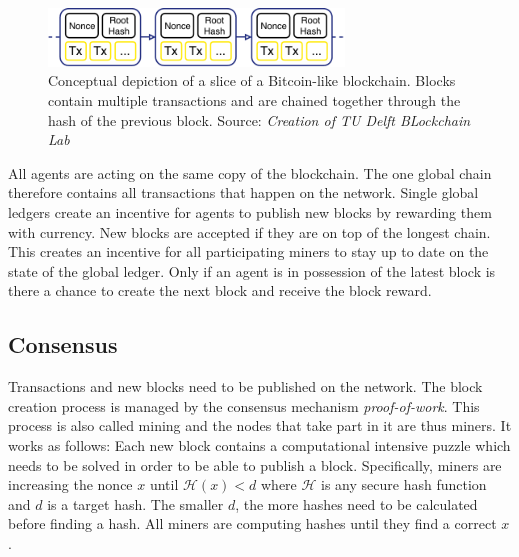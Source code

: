 \begin{figure}
    \centering
    \includegraphics[width=0.7\textwidth]{images/blockchain.pdf}
    \caption{Conceptual depiction of a slice of a Bitcoin-like blockchain. Blocks contain multiple transactions and are chained together through the hash of the previous block. Source: \textit{Creation of TU Delft BLockchain Lab}}
    \label{fig:basic_blockchain}
\end{figure}

All agents are acting on the same copy of the blockchain. The one global chain therefore contains 
all transactions that happen on the network. Single global ledgers create an incentive for agents to publish new blocks by rewarding 
them with currency. New blocks are accepted if they are on top of the longest chain. This creates 
an incentive for all participating miners to stay up to date on the state of the global ledger. Only
if an agent is in possession of the latest block is there a chance to create the next block and
receive the block reward. 



\subsection{Consensus}
Transactions and new blocks need to be published  on the network. The block creation process
is managed by the consensus mechanism \textit{proof-of-work}. This process is also called mining and the nodes
that take part in it are thus miners. It works as follows: Each new block contains a computational 
intensive puzzle which needs to be solved in order to be able to publish a block. Specifically, 
miners are increasing the nonce $x$ until $\mathcal{H}(x) < d$ where $\mathcal{H}$ is any secure hash
function and $d$ is a target hash. The smaller $d$, the more hashes need to be calculated before finding a hash.
All miners are computing hashes until they find a correct $x$. 

